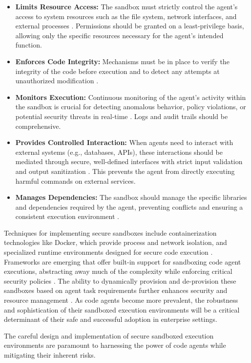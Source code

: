 \begin{itemize}
  \item \textbf{Limits Resource Access:} The sandbox must strictly control the agent's access to system resources such as the file system, network interfaces, and external processes \cite{AgentsCourse}. Permissions should be granted on a least-privilege basis, allowing only the specific resources necessary for the agent's intended function.
  \item \textbf{Enforces Code Integrity:} Mechanisms must be in place to verify the integrity of the code before execution and to detect any attempts at unauthorized modification \cite{Reger2026}.
  \item \textbf{Monitors Execution:} Continuous monitoring of the agent's activity within the sandbox is crucial for detecting anomalous behavior, policy violations, or potential security threats in real-time \cite{AgentsCourse}. Logs and audit trails should be comprehensive.
  \item \textbf{Provides Controlled Interaction:} When agents need to interact with external systems (e.g., databases, APIs), these interactions should be mediated through secure, well-defined interfaces with strict input validation and output sanitization \cite{Reger2026}. This prevents the agent from directly executing harmful commands on external services.
  \item \textbf{Manages Dependencies:} The sandbox should manage the specific libraries and dependencies required by the agent, preventing conflicts and ensuring a consistent execution environment \cite{AgentsCourse}.
\end{itemize}

Techniques for implementing secure sandboxes include containerization technologies like Docker, which provide process and network isolation, and specialized runtime environments designed for secure code execution \cite{Reger2026}. Frameworks are emerging that offer built-in support for sandboxing code agent executions, abstracting away much of the complexity while enforcing critical security policies \cite{AgentsCourse}. The ability to dynamically provision and de-provision these sandboxes based on agent task requirements further enhances security and resource management \cite{Reger2026}. As code agents become more prevalent, the robustness and sophistication of their sandboxed execution environments will be a critical determinant of their safe and successful adoption in enterprise settings.

The careful design and implementation of secure sandboxed execution environments are paramount to harnessing the power of code agents while mitigating their inherent risks.
